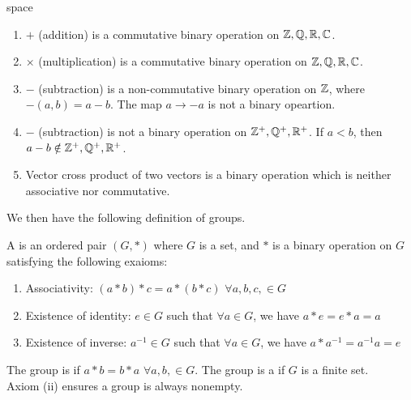 \begin{example}{\color{white}space}
\begin{enumerate}[label=(\roman*)]
\setlength{\itemsep}{0pt}
\item $+$ (addition) is a commutative binary operation on $\mathbb{Z}, \mathbb{Q}, \mathbb{R}, \mathbb{C}$.
\item $\times$ (multiplication) is a commutative binary operation on $\mathbb{Z}, \mathbb{Q}, \mathbb{R}, \mathbb{C}$.
\item $-$ (subtraction) is a non-commutative binary operation on $\mathbb{Z}$, where $-(a,b)=a-b $. The map $a \rightarrow -a$ is not a binary opeartion.
\item $-$ (subtraction) is not a binary operation on $\mathbb{Z}^+, \mathbb{Q}^+, \mathbb{R}^+$. If $a<b$, then $a-b \notin \mathbb{Z}^+, \mathbb{Q}^+, \mathbb{R}^+$.
\item Vector cross product of two vectors is a binary operation which is neither associative nor commutative.
\end{enumerate}
\end{example}

We then have the following definition of groups.

\begin{definition}
\label{def:group}
A  is an ordered pair $(G,*)$ where $G$ is a set, and $*$ is a binary operation on $G$ satisfying the following exaioms:
\begin{enumerate}[label=(\roman*)]
\setlength{\itemsep}{0pt}
\item Associativity: $(a*b)*c = a*(b*c)$ $\forall a,b,c, \in G$
\item Existence of identity: $e \in G$ such that $\forall a\in G$, we have $a*e = e*a = a$
\item Existence of inverse: $a^{-1} \in G$ such that $\forall a\in G$, we have $a*a^{-1} = a^{-1}a = e$
\end{enumerate}
The group is  if $a*b = b*a$ $\forall a,b, \in G$.
The group is a  if $G$ is a finite set. \\
Axiom (ii) ensures a group is always nonempty. 
\end{definition}

